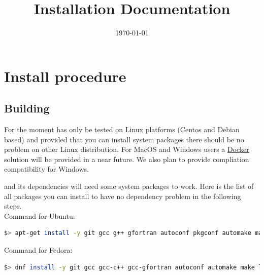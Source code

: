 \documentclass[a4paper, 12pt]{report}
\begin{document}
\title{\Dynawo Installation Documentation}
\date\today

\maketitle
\tableofcontents

\chapter{Install procedure}

\section{Building \Dynawo}
\label{Dynawo_Installation_Documentation_Building_Dynawo}

For the moment \Dynawo has only be tested on Linux platforms (Centos and Debian based) and provided that you can install system packages there should be no problem on other Linux distribution. For MacOS and Windows users a \href{https://www.docker.com/}{\underline{Docker}} solution will be provided in a near future. We also plan to provide compliation compatibility for Windows.

\Dynawo and its dependencies will need some system packages to work. Here is the list of all packages you can install to have no dependency problem in the following steps. \\

Command for Ubuntu:

\begin{lstlisting}[language=bash]
$> apt-get install -y git gcc g++ gfortran autoconf pkgconf automake make libtool cmake hwloc openjdk-8-jdk libblas-dev liblpsolve55-dev libarchive-dev doxygen doxygen-latex liblapack-dev libexpat1-dev libsqlite3-dev libxerces-c-dev zlib1g-dev gettext patch clang python-pip libncurses5-dev libreadline-dev libdigest-perl-md5-perl unzip gcovr lcov libboost-all-dev qt4-qmake qt4-dev-tools lsb-release libxml2-utils python-lxml python-psutil wget
\end{lstlisting}

Command for Fedora:

\begin{lstlisting}[language=bash]
$> dnf install -y git gcc gcc-c++ gcc-gfortran autoconf automake make libtool cmake hwloc java-1.8.0-openjdk-devel blas-devel lapack-devel lpsolve-devel expat-devel glibc-devel sqlite-devel xerces-c-devel libarchive-devel zlib-devel doxygen doxygen-latex qt-devel gettext patch wget python-devel clang llvm-devel ncurses-devel readline-devel unzip perl-Digest-MD5 vim gcovr python-pip python-psutil boost-devel lcov gtest-devel gmock-devel xz rsync python-lxml graphviz
\end{lstlisting}
\end{document}
